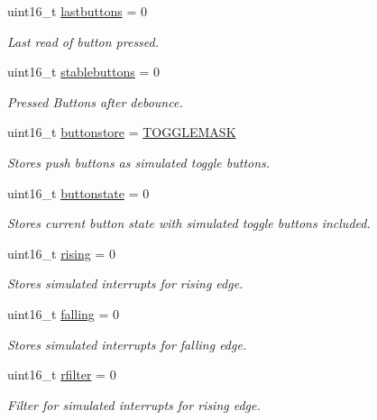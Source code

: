 \begin{DoxyCompactItemize}
\item 
uint16\+\_\+t \hyperlink{group__buttons_gac23a04180ca7609f571853499faae915}{lastbuttons} = 0
\begin{DoxyCompactList}\small\item\em Last read of button pressed. \end{DoxyCompactList}\item 
uint16\+\_\+t \hyperlink{group__buttons_gaca8bc953fb5340b58c9403b3bf8bbd8e}{stablebuttons} = 0
\begin{DoxyCompactList}\small\item\em Pressed Buttons after debounce. \end{DoxyCompactList}\item 
uint16\+\_\+t \hyperlink{group__buttons_gac52f8abe18e87b9ce8cdba2e27bbbf02}{buttonstore} = \hyperlink{group__buttons_ga77a6549a849f9a9472a367e4148289b7}{T\+O\+G\+G\+L\+E\+M\+A\+SK}
\begin{DoxyCompactList}\small\item\em Stores push buttons as simulated toggle buttons. \end{DoxyCompactList}\item 
uint16\+\_\+t \hyperlink{group__buttons_gafa19e52bd127439ef22ade9f91753386}{buttonstate} = 0
\begin{DoxyCompactList}\small\item\em Stores current button state with simulated toggle buttons included. \end{DoxyCompactList}\item 
uint16\+\_\+t \hyperlink{group__buttons_gacc4c256fa5e75c09f1b3a669d45485ec}{rising} = 0
\begin{DoxyCompactList}\small\item\em Stores simulated interrupts for rising edge. \end{DoxyCompactList}\item 
uint16\+\_\+t \hyperlink{group__buttons_ga1861b594f36400f6c17b1f65b2565816}{falling} = 0
\begin{DoxyCompactList}\small\item\em Stores simulated interrupts for falling edge. \end{DoxyCompactList}\item 
uint16\+\_\+t \hyperlink{group__buttons_ga541db091bf54e0a51180f3666e5a2ce2}{rfilter} = 0
\begin{DoxyCompactList}\small\item\em Filter for simulated interrupts for rising edge. \end{DoxyCompactList}\item 

\end{DoxyCompactItemize}
